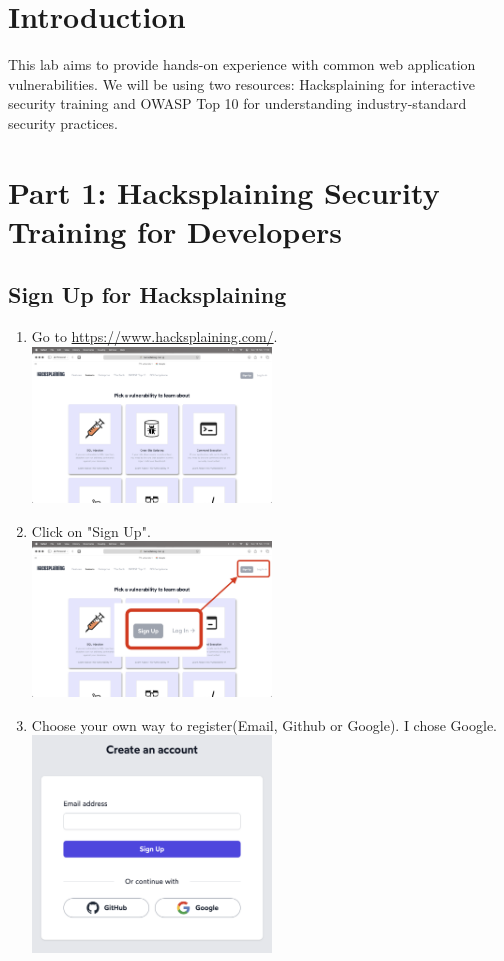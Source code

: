 \documentclass[12pt]{article}
\begin{document}
\section{Introduction}

This lab aims to provide hands-on experience with common web application vulnerabilities. We will be using two resources: Hacksplaining for interactive security training and OWASP Top 10 for understanding industry-standard security practices.

\section{Part 1: Hacksplaining Security Training for Developers}

\subsection{Sign Up for Hacksplaining}

\begin{enumerate}
    \item Go to \url{https://www.hacksplaining.com/}. \\
    \includegraphics[width=0.5\textwidth]{Image1.png}
    \item Click on "Sign Up". \\
    \includegraphics[width=0.5\textwidth]{Image2.png}
    \newpage
    \item Choose your own way to register(Email, Github or Google). I chose Google. \\
    \includegraphics[width=0.5\textwidth]{Image3.png}
\end{enumerate}
\end{document}
